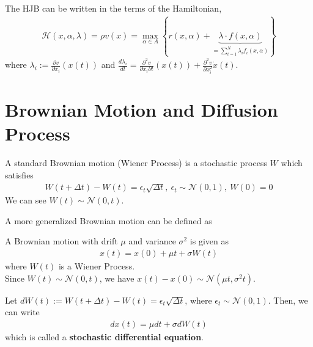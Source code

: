 \documentclass[11pt]{elegantbook}
\begin{document}
\begin{note}
    The HJB can be written in the terms of the Hamiltonian,
    \begin{equation}
        \begin{aligned}
            \mathcal{H}(x,\alpha,\lambda) = \rho v(x) = \max_{\alpha\in A} \left\{r(x,\alpha) + \underbrace{\lambda\cdot f(x,\alpha)}_{=\sum_{i=1}^N \lambda_{i} f_i(x,\alpha)}\right\}
        \end{aligned}
        \nonumber
    \end{equation}
    where $\lambda_i:=\frac{\partial v}{\partial x_i}(x(t))$ and $\frac{d \lambda_i}{dt}=\frac{\partial^2 v}{\partial x_i \partial t}(x(t))+\frac{\partial^2 v}{\partial x_i^2}\dot{x}(t)$.
\end{note}

\section{Brownian Motion and Diffusion Process}
\begin{definition}
    A standard Brownian motion (Wiener Process) is a stochastic process $W$ which satisfies
    \begin{equation}
        \begin{aligned}
            W(t+\Delta t)-W(t)=\epsilon_t\sqrt{\Delta t},\ \epsilon_t\sim \mathcal{N}(0,1),\ W(0)=0
        \end{aligned}
        \nonumber
    \end{equation}
    We can see $W(t)\sim \mathcal{N}(0,t)$.
\end{definition}
A more generalized Brownian motion can be defined as
\begin{definition}
    A Brownian motion with drift $\mu$ and variance $\sigma^2$ is given as
    \begin{equation}
        \begin{aligned}
            x(t)=x(0)+ \mu t + \sigma W(t)
        \end{aligned}
        \nonumber
    \end{equation}
    where $W(t)$ is a Wiener Process.\\
    Since $W(t)\sim \mathcal{N}(0,t)$, we have $x(t)-x(0)\sim \mathcal{N}(\mu t,\sigma^2 t)$.
\end{definition}
Let $dW(t):=W(t+\Delta t)-W(t)=\epsilon_t\sqrt{\Delta t}$, where $\epsilon_t\sim \mathcal{N}(0,1)$. Then, we can write
\begin{equation}
    \begin{aligned}
        d x(t)= \mu dt + \sigma d W(t)
    \end{aligned}
    \nonumber
\end{equation}
which is called a \textbf{stochastic differential equation}.
\end{document}
